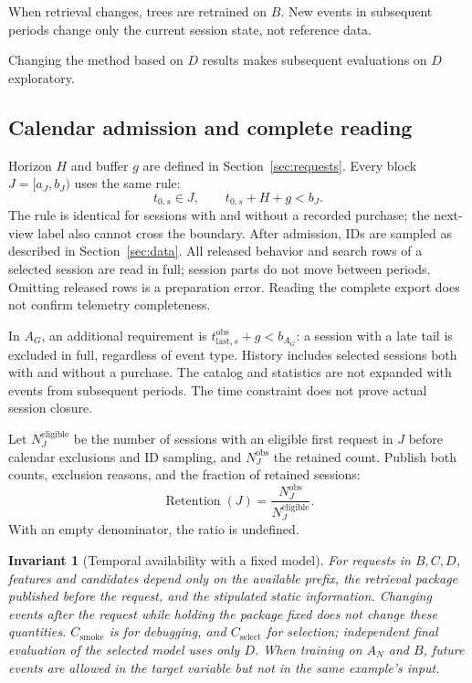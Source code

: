 \documentclass[12pt,a4paper]{article}
\theoremstyle{plainru}
\newtheorem{invariant}{Invariant}[section]
\begin{document}
When retrieval changes, trees are retrained on $B$.
New events in subsequent periods change only
the current session state, not reference data.

Changing the method based on $D$ results
makes subsequent evaluations on $D$ exploratory.

\subsection{Calendar admission and complete reading}\label{sec:eval-maturity}

Horizon $H$ and buffer $g$ are defined in Section~\ref{sec:requests}.
Every block $J=[a_J,b_J)$ uses the same rule:
\begin{equation}\label{eq:eval-admission}
t_{0,s}\in J,\qquad t_{0,s}+H+g<b_J.
\end{equation}
The rule is identical for sessions with and without a recorded purchase;
the next-view label also cannot cross the boundary.
After admission, IDs are sampled as described in Section~\ref{sec:data}.
All released behavior and search rows of a selected session
are read in full; session parts do not move between periods.
Omitting released rows is a preparation error.
Reading the complete export does not confirm telemetry completeness.

In $A_G$, an additional requirement is
$t_{\mathrm{last},s}^{\mathrm{obs}}+g<b_{A_G}$:
a session with a late tail is excluded in full, regardless of event type.
History includes selected sessions both with and without a purchase.
The catalog and statistics are not expanded with events from subsequent periods.
The time constraint does not prove actual session closure.

Let $N_J^{\mathrm{eligible}}$ be the number of sessions with an eligible first
request in $J$ before calendar exclusions and ID sampling, and
$N_J^{\mathrm{obs}}$ the retained count. Publish both counts,
exclusion reasons, and the fraction of retained sessions:
\begin{equation}\label{eq:eval-retention}
\operatorname{Retention}(J)=
\frac{N_J^{\mathrm{obs}}}{N_J^{\mathrm{eligible}}}.
\end{equation}
With an empty denominator, the ratio is undefined.

\begin{invariant}[Temporal availability with a fixed model]
\label{inv:eval-no-leakage}
For requests in $B,C,D$, features and candidates
depend only on the available prefix, the retrieval package published
before the request, and the stipulated static information.
Changing events after the request while holding the package fixed
does not change these quantities. $C_{\mathrm{smoke}}$ is for debugging,
and $C_{\mathrm{select}}$ for selection; independent final
evaluation of the selected model uses only $D$.
When training on $A_N$ and $B$, future events are allowed
in the target variable but not in the same example's input.
\end{invariant}
\end{document}
